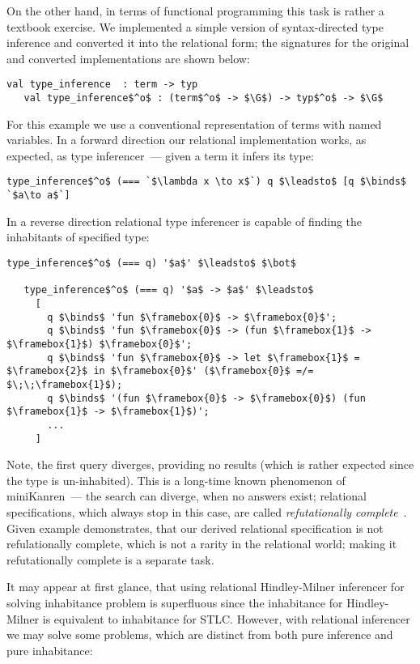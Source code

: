 On the other hand, in terms of functional programming this task is rather a textbook exercise. We implemented a simple version of
syntax-directed type inference and converted it into the relational form; the signatures for the original and converted
implementations are shown below:

\begin{lstlisting}[basicstyle=\small]
   val type_inference  : term -> typ
   val type_inference$^o$ : (term$^o$ -> $\G$) -> typ$^o$ -> $\G$
\end{lstlisting}

For this example we use a conventional representation of terms with named variables. In a forward direction our relational implementation works, 
as expected, as type inferencer~--- given a term it infers its type:

\begin{lstlisting}[basicstyle=\small]
   type_inference$^o$ (=== `$\lambda x \to x$`) q $\leadsto$ [q $\binds$ `$a\to a$`]
\end{lstlisting}

In a reverse direction relational type inferencer is capable of finding the inhabitants of specified type:

\begin{lstlisting}[basicstyle=\small]
   type_inference$^o$ (=== q) '$a$' $\leadsto$ $\bot$

   type_inference$^o$ (=== q) '$a$ -> $a$' $\leadsto$ 
     [
       q $\binds$ 'fun $\framebox{0}$ -> $\framebox{0}$'; 
       q $\binds$ 'fun $\framebox{0}$ -> (fun $\framebox{1}$ -> $\framebox{1}$) $\framebox{0}$'; 
       q $\binds$ 'fun $\framebox{0}$ -> let $\framebox{1}$ = $\framebox{2}$ in $\framebox{0}$' ($\framebox{0}$ =/= $\;\;\framebox{1}$);
       q $\binds$ '(fun $\framebox{0}$ -> $\framebox{0}$) (fun $\framebox{1}$ -> $\framebox{1}$)';
       ...
     ]
\end{lstlisting}

Note, the first query diverges, providing no results (which is rather expected since the type is un-inhabited). This is a long-time known phenomenon of
miniKanren~--- the search can diverge, when no answers exist; relational specifications, which always stop in this case, are called
\emph{refutationally complete}~\cite{WillThesis}. Given example demonstrates, that our derived relational specification is not refulationally
complete, which is not a rarity in the relational world; making it refutationally complete is a separate task.

It may appear at first glance, that using relational Hindley-Milner inferencer for solving inhabitance problem is superfluous since the inhabitance for
Hindley-Milner is equivalent to inhabitance for STLC. However, with relational inferencer we may solve some problems, which are distinct from
both pure inference and pure inhabitance:

